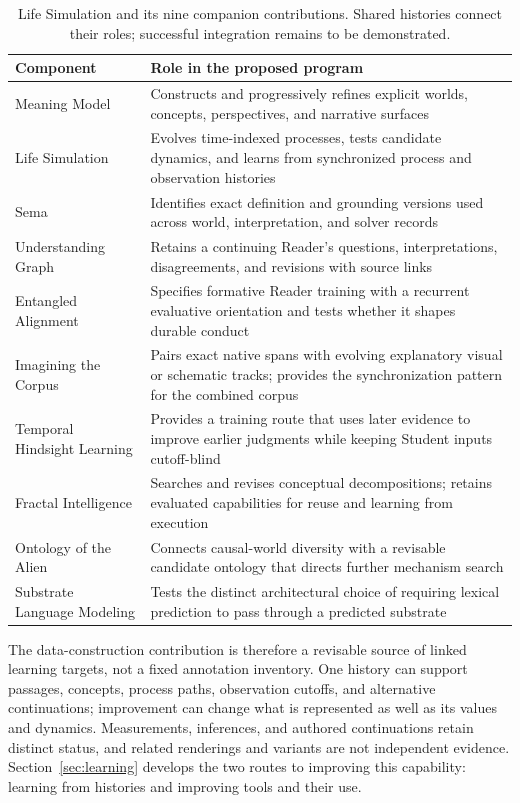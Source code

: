 \documentclass[10pt]{article}
\begin{document}
\begin{table}[!htbp]
\centering
\small
\begin{tabularx}{\textwidth}{@{}p{}Y@{}}
\toprule
Component & Role in the proposed program \\
\midrule
Meaning Model & Constructs and progressively refines explicit worlds, concepts, perspectives, and narrative surfaces \\
Life Simulation & Evolves time-indexed processes, tests candidate dynamics, and learns from synchronized process and observation histories \\
Sema & Identifies exact definition and grounding versions used across world, interpretation, and solver records \\
Understanding Graph & Retains a continuing Reader's questions, interpretations, disagreements, and revisions with source links \\
Entangled Alignment & Specifies formative Reader training with a recurrent evaluative orientation and tests whether it shapes durable conduct \\
Imagining the Corpus & Pairs exact native spans with evolving explanatory visual or schematic tracks; provides the synchronization pattern for the combined corpus \\
Temporal Hindsight Learning & Provides a training route that uses later evidence to improve earlier judgments while keeping Student inputs cutoff-blind \\
Fractal Intelligence & Searches and revises conceptual decompositions; retains evaluated capabilities for reuse and learning from execution \\
Ontology of the Alien & Connects causal-world diversity with a revisable candidate ontology that directs further mechanism search \\
Substrate Language Modeling & Tests the distinct architectural choice of requiring lexical prediction to pass through a predicted substrate \\
\bottomrule
\end{tabularx}
\caption{Life Simulation and its nine companion contributions. Shared histories
connect their roles; successful integration remains to be demonstrated.}
\label{tab:program-roles}
\end{table}

The data-construction contribution is therefore a revisable source of linked
learning targets, not a fixed annotation inventory. One history can support
passages, concepts, process paths, observation cutoffs, and alternative
continuations; improvement can change what is represented as well as its
values and dynamics. Measurements, inferences, and authored continuations
retain distinct status, and related renderings and variants are not
independent evidence. Section~\ref{sec:learning} develops the two routes to
improving this capability: learning from histories and improving tools and
their use.
\end{document}
